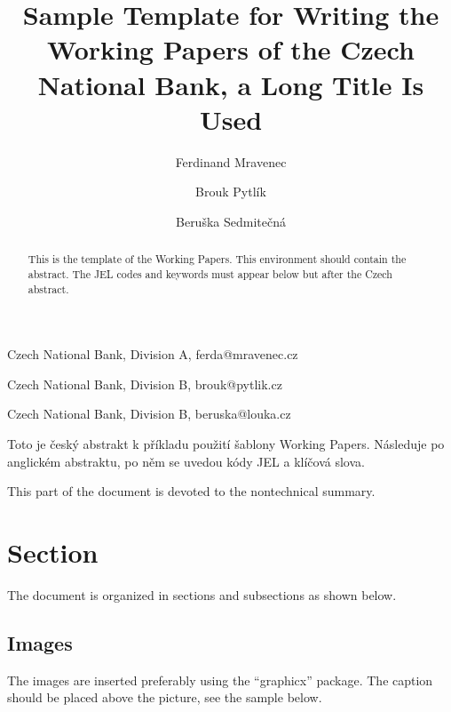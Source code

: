 \documentclass{cnbwp}
\begin{document}
\title{Sample Template for Writing the Working Papers of the Czech National Bank, a Long Title Is
Used}
\author{Ferdinand Mravenec}{Czech National Bank, Division A, ferda@mravenec.cz}
\author{Brouk Pytl\'ik}{Czech National Bank, Division B, brouk@pytlik.cz}
\author{Beru\v{s}ka Sedmite\v{c}n\'a}{Czech National Bank, Division B, beruska@louka.cz}
\maketitle

\begin{abstract}
This is the template of the Working Papers. This environment should contain the abstract. The JEL
codes and keywords must appear below but after the Czech abstract.
\end{abstract}

\begin{abstrakt}
Toto je \v{c}esk\'y abstrakt k p\v{r}\'ikladu pou\v{z}it\'i \v{s}ablony Working Papers. N\'asleduje po anglick\'em abstraktu,
po n\v{e}m se uvedou k\'ody JEL a kl\'i\v{c}ov\'a slova.
\end{abstrakt}



\begin{nontechsummary}
This part of the document is devoted to the nontechnical summary.
\end{nontechsummary}

\section{Section}
The document is organized in sections and subsections as shown below.

\subsection{Images}
The images are inserted preferably using the ``graphicx'' package. The caption should be placed
above the picture, see the sample below.
\end{document}
